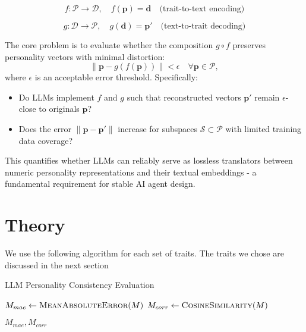 \documentclass[12pt]{article}
\begin{document}
\begin{equation}
    f: \mathcal{P} \to \mathcal{D}, \quad f(\mathbf{p}) = \mathbf{d} \quad \text{(trait-to-text encoding)}
\end{equation}

\begin{equation}
    g: \mathcal{D} \to \mathcal{P}, \quad g(\mathbf{d}) = \mathbf{p'} \quad \text{(text-to-trait decoding)}
\end{equation}

The core problem is to evaluate whether the composition $g \circ f$ preserves personality vectors with minimal distortion:
\begin{equation}
    \|\mathbf{p} - g(f(\mathbf{p}))\| < \epsilon \quad \forall \mathbf{p} \in \mathcal{P},
\end{equation}
where $\epsilon$ is an acceptable error threshold. Specifically:

\begin{itemize}
    \item Do LLMs implement $f$ and $g$ such that reconstructed vectors $\mathbf{p'}$ remain $\epsilon$-close to originals $\mathbf{p}$?
    \item Does the error $\|\mathbf{p} - \mathbf{p'}\|$ increase for subspaces $\mathcal{S} \subset \mathcal{P}$ with limited training data coverage?
\end{itemize}

This quantifies whether LLMs can reliably serve as lossless translators between numeric personality representations and their textual embeddings - a fundamental requirement for stable AI agent design.

\section{Theory}

We use the following algorithm for each set of traits. The traits we chose are discussed in the next section



\begin{algorithm}[H]
\caption{LLM Personality Consistency Evaluation}

\SetAlgoLined
\DontPrintSemicolon



$M_{mae} \gets \Call{MeanAbsoluteError}{M}$\;
$M_{corr} \gets \Call{CosineSimilarity}{M}$\;

\Return $M_{mae}, M_{corr}$\;


\end{algorithm}
\end{document}
